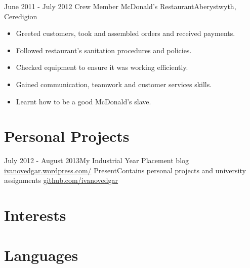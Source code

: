 \documentclass[11pt,a4paper]{moderncv}
\begin{document}
\cventry
	{June 2011 - July 2012 }{Crew Member}
	{McDonald's Restaurant}{Aberystwyth, Ceredigion}
	{}{
    	\begin{itemize}
           \item Greeted customers, took and assembled orders and received payments.
           \item Followed restaurant's sanitation procedures and policies.
           \item Checked equipment to ensure it was working efficiently.
           \item Gained communication, teamwork and customer services skills.
           \item Learnt how to be a good McDonald's slave.
    	\end{itemize}
	}
	
\section{Personal Projects}
\cventry
	{July 2012 - August 2013}{My Industrial Year Placement blog}
	{\href{http://ivanovedgar.wordpress.com/}{ivanovedgar.wordpress.com/}}{}
	{}{}
\cventry
	{Present}{Contains personal projects and university assignments}
	{\href{http://github.com/ivanovedgar}{github.com/ivanovedgar}}{}
	{}{}

\section{Interests}

\section{Languages}
\end{document}

